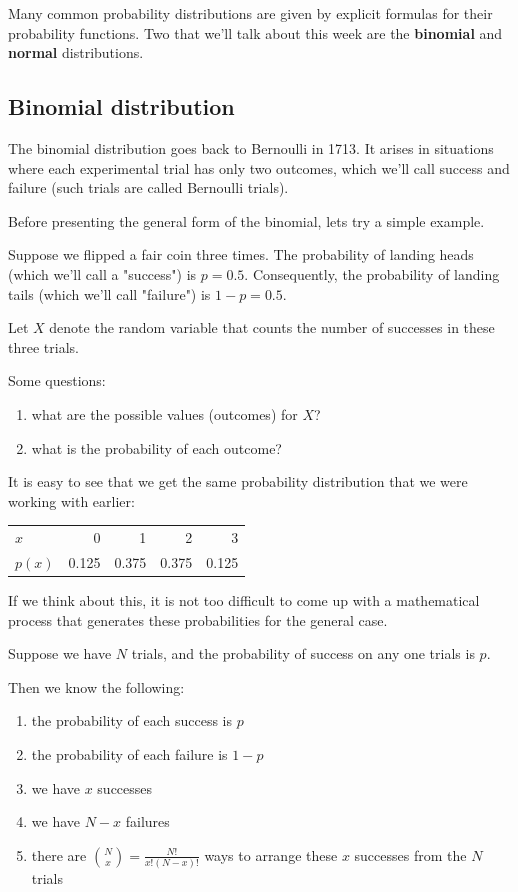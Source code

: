 \documentclass[11pt]{article}
\begin{document}
Many common probability distributions are given by explicit formulas for their probability functions.  Two that we'll talk about this week are the \textbf{binomial} and \textbf{normal} distributions.

\subsection*{Binomial distribution}
\label{sec-3-1}

The binomial distribution goes back to Bernoulli in 1713.  It arises in situations where each experimental trial has only two outcomes, which we'll call success and failure (such trials are called Bernoulli trials).  

Before presenting the general form of the binomial, lets try a simple example.

Suppose we flipped a fair coin three times.  The probability of landing heads (which we'll call a "success") is $p=0.5$.  Consequently, the probability of landing tails (which we'll call "failure") is $1-p=0.5$.

Let $X$ denote the random variable that counts the number of successes in these three trials.

Some questions:
\begin{enumerate}
\item what are the possible values (outcomes) for $X$?
\item what is the probability of each outcome?
\end{enumerate}

It is easy to see that we get the same probability distribution that we were working with earlier:

\begin{center}
\begin{tabular}{lrrrr}
$x$ & 0 & 1 & 2 & 3\\
$p(x)$ & 0.125 & 0.375 & 0.375 & 0.125\\
\end{tabular}
\end{center}

If we think about this, it is not too difficult to come up with a mathematical process that generates these probabilities for the general case.

Suppose we have $N$ trials, and the probability of success on any one trials is $p$.

Then we know the following:
\begin{enumerate}
\item the probability of each success is $p$
\item the probability of each failure is $1-p$
\item we have $x$ successes
\item we have $N-x$ failures
\item there are ${N\choose x}=\frac{N!}{x!(N-x)!}$ ways to arrange these $x$ successes from the $N$ trials
\end{enumerate}
\end{document}
